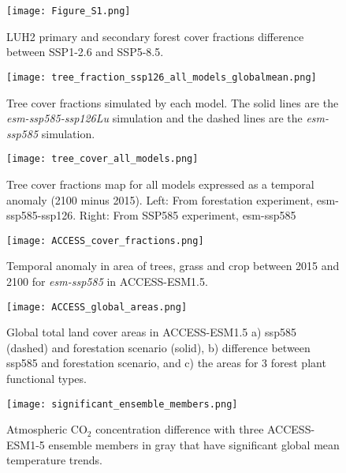 \documentclass[draft,gbc]{agutexSI2019}
\begin{document}
%

\begin{figure}
    \texttt{[image: Figure\_S1.png]}
    \caption{LUH2 primary and secondary forest cover fractions difference between SSP1-2.6 and SSP5-8.5.}
    \label{fig:LUH2DIFF}
\end{figure}

\begin{figure}
    \texttt{[image: tree\_fraction\_ssp126\_all\_models\_globalmean.png]}
    \caption{Tree cover fractions simulated by each model. The solid lines are the \textit{esm-ssp585-ssp126Lu} simulation and the dashed lines are the \textit{esm-ssp585} simulation.}
    \label{fig:tree_fractions_models}
\end{figure}

\begin{figure}
    \texttt{[image: tree\_cover\_all\_models.png]}
    \caption{Tree cover fractions map for all models expressed as a temporal anomaly (2100 minus 2015). Left: From forestation experiment, esm-ssp585-ssp126. Right: From SSP585 experiment, esm-ssp585}
    \label{fig:tree_area_maps_ssp126Lu}
\end{figure}

\begin{figure}
    \texttt{[image: ACCESS\_cover\_fractions.png]}
    \caption{Temporal anomaly in area of trees, grass and crop between 2015 and 2100 for \textit{esm-ssp585} in ACCESS-ESM1.5.}
    \label{fig:ACCESS_land_cover}
\end{figure}

\begin{figure}
    \texttt{[image: ACCESS\_global\_areas.png]}
    \caption{Global total land cover areas in ACCESS-ESM1.5 a) ssp585 (dashed) and forestation scenario (solid), b) difference between ssp585 and forestation scenario, and c) the areas for 3 forest plant functional types.}
    \label{fig:ACCESS_land_use}
\end{figure}

\begin{figure}
    \centering
    \texttt{[image: significant\_ensemble\_members.png]}
    \caption{Atmospheric CO$_2$ concentration difference with three ACCESS-ESM1-5 ensemble members in gray that have significant global mean temperature trends.}
    \label{fig:models_co2_access_members}
\end{figure}
\end{document}
